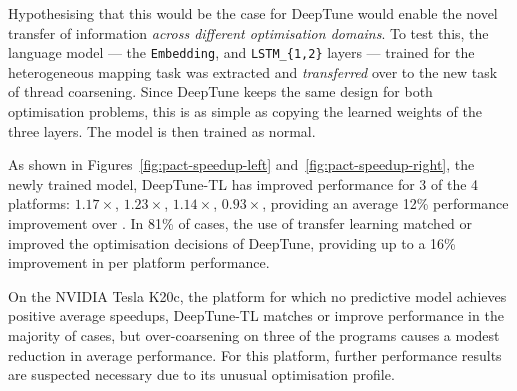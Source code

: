 Hypothesising that this would be the case for DeepTune would enable the novel transfer of information \emph{across different optimisation domains}. To test this, the language model --- the \texttt{Embedding}, and \texttt{LSTM\_\{1,2\}} layers --- trained for the heterogeneous mapping task was extracted and \emph{transferred} over to the new task of thread coarsening. Since DeepTune keeps the same design for both optimisation problems, this is as simple as copying the learned weights of the three layers. The model is then trained as normal.

As shown in Figures~\ref{fig:pact-speedup-left} and~\ref{fig:pact-speedup-right}, the newly trained model, DeepTune-TL has improved performance for 3 of the 4 platforms: $1.17\times$, $1.23\times$, $1.14\times$, $0.93\times$, providing an average 12\% performance improvement over \citeauthor{Magni2014}. In 81\% of cases, the use of transfer learning matched or improved the optimisation decisions of DeepTune, providing up to a 16\% improvement in per platform performance.

On the NVIDIA Tesla K20c, the platform for which no predictive model achieves positive average speedups, DeepTune-TL matches or improve performance in the majority of cases, but over-coarsening on three of the programs causes a modest reduction in average performance. For this platform, further performance results are suspected necessary due to its unusual optimisation profile.
